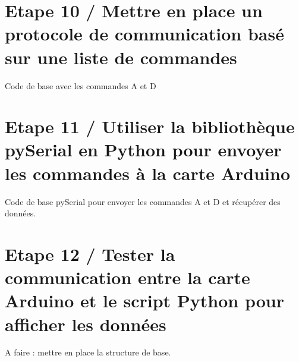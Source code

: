 \documentclass[a4paper,11pt,titlepage]{article} %
\begin{document}
\section{Etape 10 / Mettre en place un protocole de communication basé sur une liste de commandes}

Code de base avec les commandes A et D

\section{Etape 11 / Utiliser la bibliothèque pySerial en Python pour envoyer les commandes à la carte Arduino}

Code de base pySerial pour envoyer les commandes A et D et récupérer des données.

\section{Etape 12 / Tester la communication entre la carte Arduino et le script Python pour afficher les données}

A faire : mettre en place la structure de base.






\end{document}
